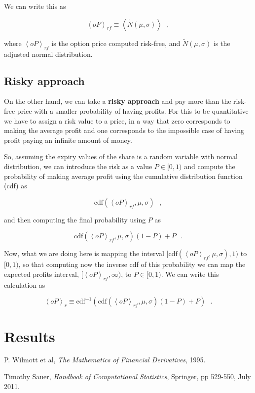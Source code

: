 \documentclass[8 pt]{article}
\newcommand{\avg}[1]{\left\langle #1 \right\rangle}
\begin{document}
We can write this as

\begin{equation}
  \avg{oP}_{rf} \equiv \avg{\tilde N(\mu, \sigma)} ~~~ ,
\end{equation}

where $\avg{oP}_{rf}$ is the option price computed risk-free, and $\tilde N(\mu, \sigma)$ is the adjusted normal distribution.

\subsection{Risky approach}

On the other hand, we can take a \textbf{risky approach} and pay more than the risk-free price with a smaller probability of having profits. For this to be quantitative we have to assign a risk value to a price, in a way that zero corresponds to making the average profit and one corresponds to the impossible case of having profit paying an infinite amount of money.

So, assuming the expiry values of the share is a random variable with normal distribution, we can introduce the risk as a value $P \in [0, 1)$ and compute the probability of making average profit using the cumulative distribution function (cdf) as

\begin{equation*}
  \text{cdf}(\avg{oP}_{rf}, \mu, \sigma) ~~~ ,
\end{equation*}

and then computing the final probability using $P$ as

\begin{equation*}
  \text{cdf}(\avg{oP}_{rf}, \mu, \sigma)(1 - P) + P ~~~ .
\end{equation*}

Now, what we are doing here is mapping the interval $[\text{cdf}(\avg{oP}_{rf}, \mu, \sigma), 1)$ to $[0, 1)$, so that computing now the inverse cdf of this probability we can map the expected profits interval, $[\avg{oP}_{rf}, \infty)$, to $P \in [0, 1)$. We can write this calculation as

\begin{equation}
  \avg{oP}_r \equiv \text{cdf}^{-1} \left( \text{cdf}(\avg{oP}_{rf}, \mu, \sigma)(1 - P) + P \right) ~~~ .
\end{equation}

\section{Results}



\begin{thebibliography}{28}
\raggedright
{}

 P. Wilmott et al, \emph{The Mathematics of Financial Derivatives}, 1995.

 Timothy Sauer, \emph{Handbook of Computational Statistics}, Springer, pp 529-550, July 2011.

\end{thebibliography}
\end{document}
